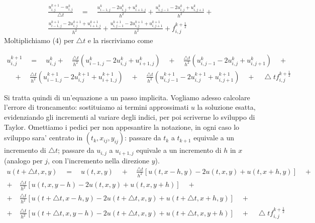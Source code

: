 \documentclass[]{article}
\begin{document}
\begin{equation}
\begin{split}
\frac{u^{k+1}_{i,j}-u^k_{i,j}}{\bigtriangleup t}  \quad = \quad  \frac{u^{k}_{i-1,j} -2u^{k}_{i,j} + u^{k}_{i+1,j}}{h^2}  +  \frac{u^{k}_{i,j-1} -2u^{k}_{i,j} + u^{k}_{i,j+1}}{h^2}  + \\
\frac{u^{k+1}_{i-1,j} -2u^{k+1}_{i,j} + u^{k+1}_{i+1,j}}{h^2}  +  \frac{u^{k+1}_{i,j-1} -2u^{k+1}_{i,j}  +  u^{k+1}_{i,j+1}}{h^2} + f^{k+\frac{1}{2}}_{i,j}
\end{split}
\end{equation}
Moltiplichiamo (4) per $\bigtriangleup t$ e la riscriviamo come

\begin{equation}
\begin{split}
u^{k+1}_{i,j}  \quad = \quad  u^k_{i,j}+ \quad  \frac{\bigtriangleup t}{h^2} (u^{k}_{i-1,j} -2u^{k}_{i,j} + u^{k}_{i+1,j})  \quad + \quad 
\frac{\bigtriangleup t}{h^2} (u^{k}_{i,j-1} -2u^{k}_{i,j} + u^{k}_{i,j+1})  \quad + \\
\quad + \quad \frac{\bigtriangleup t}{h^2} (u^{k+1}_{i-1,j} -2u^{k+1}_{i,j} + u^{k+1}_{i+1,j}) \quad + \quad \frac{\bigtriangleup t}{h^2} (u^{k+1}_{i,j-1} -2u^{k+1}_{i,j} + u^{k+1}_{i,j+1}) \quad + \quad \bigtriangleup t f^{k+\frac{1}{2}}_{i,j}
\end{split}
\end{equation}

Si tratta quindi di un'equazione a un passo implicita. Vogliamo adesso calcolare l'errore di troncamento: sostituiamo ai termini approssimati $u$ la soluzione esatta, evidenziando gli incrementi al variare degli indici, per poi scriverne lo sviluppo di Taylor. Omettiamo i pedici per non appesantire la notazione, in ogni caso lo sviluppo sara' centrato in $(t_k, x_{ij}, y_{ij})$: passare da $t_k$ a $t_{k+1}$ equivale a un incremento di $\bigtriangleup t$; passare da $u_{i,j}$ a $u_{i+1,j}$ equivale a un incremento di $h$ in $x$ (analogo per $j$, con l'incremento nella direzione $y$).
\begin{equation}
\begin{split}
u(t+ \bigtriangleup t, x, y)  \quad = \quad  u(t, x, y)  \quad + \quad  \frac{\bigtriangleup t}{h^2} \left[u(t, x-h, y) -2u(t,x,y) + u(t, x+h, y)\right]  \quad +\\
+ \quad \frac{\bigtriangleup t}{h^2} \left[u(t, x, y-h) -2u(t,x,y) + u(t, x, y+h)\right]  \quad +\\
+ \quad \frac{\bigtriangleup t}{h^2} \left[u(t+\bigtriangleup t, x-h, y) -2u(t+ \bigtriangleup t,x,y) + u(t+ \bigtriangleup t, x+h, y)\right]  \quad +\\
+ \quad \frac{\bigtriangleup t}{h^2} \left[u(t +\bigtriangleup t, x, y-h) -2u(t+\bigtriangleup t,x,y) + u(t+\bigtriangleup t, x, y+h)\right]  \quad +  \quad \bigtriangleup t f^{k+\frac{1}{2}}_{i,j}
\end{split}
\end{equation}
\end{document}
